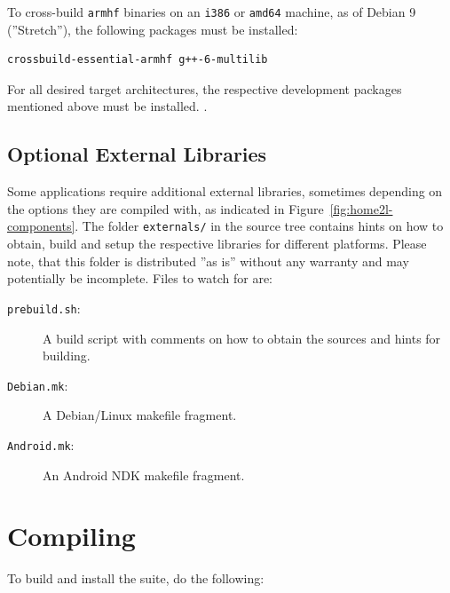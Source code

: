 \documentclass[12pt,english,parskip=half]{scrreprt}
\begin{document}
To cross-build \texttt{armhf} binaries on an \texttt{i386} or
\texttt{amd64} machine, as of Debian 9 (''Stretch''), the following packages
must be installed:

\begin{lstlisting}
crossbuild-essential-armhf g++-6-multilib
\end{lstlisting}

For all desired target architectures, the respective development packages mentioned above must be installed.
.



\subsection{Optional External Libraries}
\label{sec:installing-external}


Some applications require additional external libraries, sometimes
depending on the options they are compiled with, as indicated in
Figure~\ref{fig:home2l-components}. The folder
\texttt{externals/} in the source tree contains hints on how to
obtain, build and setup the respective libraries for different
platforms. Please note, that this folder is distributed ''as is''
without any warranty and may potentially be incomplete. Files to watch for are:

\begin{description}
\item[\texttt{prebuild.sh}:]
  A build script with comments on how to obtain the sources and hints for building.
\item[\texttt{Debian.mk}:]
  A Debian/Linux makefile fragment.
\item[\texttt{Android.mk}:]
  An Android NDK makefile fragment.
\end{description}





\section{Compiling}
\label{sec:installing-compiling}


To build and install the suite, do the following:
\end{document}
